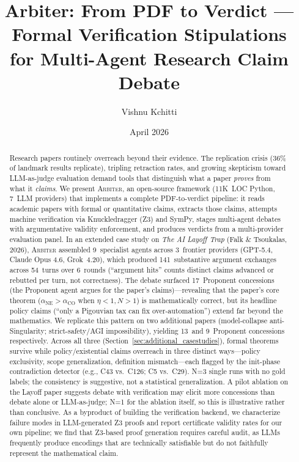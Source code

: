 \documentclass[11pt]{article}
\title{Arbiter: From PDF to Verdict --- Formal Verification Stipulations\\for Multi-Agent Research Claim Debate}
\author{Vishnu Kchitti}
\date{April 2026}
\newcommand{\arbiter}{\textsc{Arbiter}}
\begin{document}
\maketitle

\begin{abstract}
Research papers routinely overreach beyond their evidence.
The replication crisis (36\% of landmark results replicate), tripling retraction rates, and growing skepticism toward LLM-as-judge evaluation demand tools that distinguish what a paper \emph{proves} from what it \emph{claims}.
We present \arbiter{}, an open-source framework (11K~LOC Python, 7~LLM providers) that implements a complete PDF-to-verdict pipeline: it reads academic papers with formal or quantitative claims, extracts those claims, attempts machine verification via Knuckledragger (Z3) and SymPy, stages multi-agent debates with argumentative validity enforcement, and produces verdicts from a multi-provider evaluation panel.
In an extended case study on \emph{The AI Layoff Trap} (Falk \& Tsoukalas, 2026), \arbiter{} assembled 9~specialist agents across 3~frontier providers (GPT-5.4, Claude Opus 4.6, Grok~4.20), which produced 141~substantive argument exchanges across 54~turns over 6~rounds (``argument hits'' counts distinct claims advanced or rebutted per turn, not correctness).
The debate surfaced 17~Proponent concessions (the Proponent agent argues for the paper's claims)---revealing that the paper's core theorem ($\alpha_{\mathrm{NE}} > \alpha_{\mathrm{CO}}$ when $\eta < 1, N > 1$) is mathematically correct, but its headline policy claims (``only a Pigouvian tax can fix over-automation'') extend far beyond the mathematics.
We replicate this pattern on two additional papers (model-collapse anti-Singularity; strict-safety/AGI impossibility), yielding 13~and 9~Proponent concessions respectively. Across all three (Section~\ref{sec:additional_casestudies}), formal theorems survive while policy/existential claims overreach in three distinct ways---policy exclusivity, scope generalization, definition mismatch---each flagged by the init-phase contradiction detector (e.g., C43 vs.\ C126; C5 vs.\ C29). N=3 single runs with no gold labels; the consistency is suggestive, not a statistical generalization.
A pilot ablation on the Layoff paper suggests debate with verification may elicit more concessions than debate alone or LLM-as-judge; N=1 for the ablation itself, so this is illustrative rather than conclusive.
As a byproduct of building the verification backend, we characterize failure modes in LLM-generated Z3 proofs and report certificate validity rates for our own pipeline; we find that Z3-based proof generation requires careful audit, as LLMs frequently produce encodings that are technically satisfiable but do not faithfully represent the mathematical claim.

\end{abstract}
\end{document}
